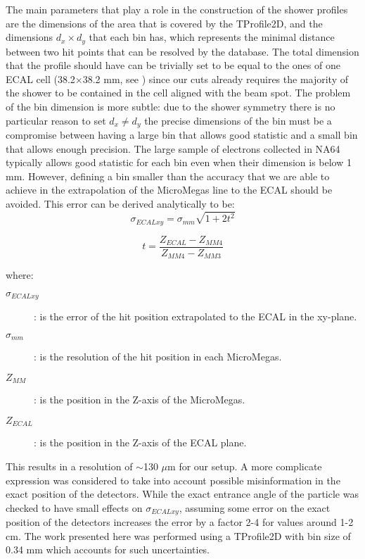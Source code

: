 The main parameters that play a role in the construction of the shower
profiles are the dimensions of the area that is covered by the
TProfile2D, and the dimensions $d_x \times d_y$ that each bin has,
which represents the minimal distance between two hit points that can
be resolved by the database.  The total dimension that the profile
should have can be trivially set to be equal to the ones of one ECAL
cell (38.2$\times$38.2 mm, see \cite{na64-detectors}) since our cuts
already requires the majority of the shower to be contained in the
cell aligned with the beam spot. The problem of the bin dimension is
more subtle: due to the shower symmetry there is no particular reason
to set $d_x \neq d_y$ the precise dimensions of the bin must be a
compromise between having a large bin that allows good statistic and a
small bin that allows enough precision. The large sample of electrons
collected in NA64 typically allows good statistic for each bin even
when their dimension is below 1 mm. However, defining a bin smaller
than the accuracy that we are able to achieve in the extrapolation of
the MicroMegas line to the ECAL should be avoided. This error can be
derived analytically to be:
\begin{equation}
  \sigma_{ECALxy} = \sigma_{mm}\sqrt{1+2t^2}
  \label{eqn:MMerror}
\end{equation}

\begin{equation}
  t = \frac{Z_{ECAL}-Z_{MM4}}{Z_{MM4}-Z_{MM3}}
  \label{eqn:T}
\end{equation}

where:
\begin{description}
\item[$\sigma_{ECALxy}$]: is the error of the hit position
  extrapolated to the ECAL in the xy-plane.
\item[$\sigma_{mm}$]: is the resolution of the hit position in each
  MicroMegas.
\item[$Z_{MM}$]: is the position in the Z-axis of the MicroMegas.
\item[$Z_{ECAL}$]: is the position in the Z-axis of the ECAL plane.
\end{description}


This results in a resolution of $\sim$130 $\mu$m for our setup. A more
complicate expression was considered to take into account possible
misinformation in the exact position of the detectors. While the exact
entrance angle of the particle was checked to have small effects on
$\sigma_{ECALxy}$, assuming some error on the exact position of the
detectors increases the error by a factor 2-4 for values around 1-2
cm. The work presented here was performed using a TProfile2D
with bin size of 0.34 mm which accounts for such uncertainties.

